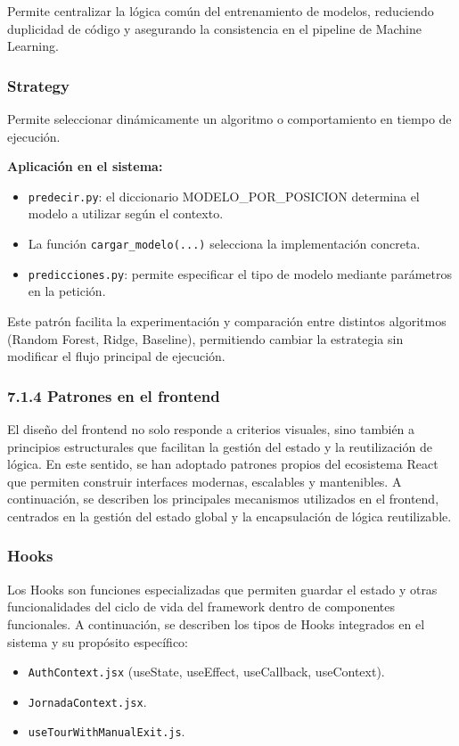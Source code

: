 Permite centralizar la lógica común del entrenamiento de modelos, reduciendo
duplicidad de código y asegurando la consistencia en el pipeline de Machine
Learning.

\subsubsection{Strategy}

Permite seleccionar dinámicamente un algoritmo o comportamiento en tiempo de
ejecución.

\textbf{Aplicación en el sistema:}
\begin{itemize}
\item \texttt{predecir.py}: el diccionario MODELO\_POR\_POSICION determina el
modelo a utilizar según el contexto.
\item La función \texttt{cargar\_modelo(...)} selecciona la implementación
concreta.
\item \texttt{predicciones.py}: permite especificar el tipo de modelo mediante
parámetros en la petición.
\end{itemize}

Este patrón facilita la experimentación y comparación entre distintos algoritmos
(Random Forest, Ridge, Baseline), permitiendo cambiar la estrategia sin
modificar el flujo principal de ejecución.

\subsubsection{7.1.4 Patrones en el frontend}
El diseño del frontend no solo responde a criterios visuales, sino también a
principios estructurales que facilitan la gestión del estado y la reutilización
de lógica. En este sentido, se han adoptado patrones propios del ecosistema
React que permiten construir interfaces modernas, escalables y mantenibles.
A continuación, se describen los principales mecanismos utilizados en el
frontend, centrados en la gestión del estado global y la encapsulación de lógica
reutilizable.


\subsubsection{Hooks}

Los Hooks son funciones especializadas que permiten guardar el estado y otras funcionalidades 
del ciclo de vida del framework dentro de componentes funcionales. A continuación, se describen 
los tipos de Hooks integrados en el sistema y su propósito específico:
\begin{itemize}
\item \texttt{AuthContext.jsx} (useState, useEffect, useCallback, useContext).
\item \texttt{JornadaContext.jsx}.
\item \texttt{useTourWithManualExit.js}.
\end{itemize}

